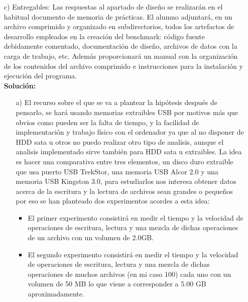 \documentclass[a4paper, 10pt]{article} %
\begin{document}
\begin{itemize}
\item[c)] Entregables:
Las respuestas al apartado de diseño se realizarán en el habitual documento de memoria de prácticas.
El alumno adjuntará, en un archivo comprimido y organizado en subdirectorios, todos los artefactos de desarrollo empleados en la creación del benchmark: código fuente debidamente comentado, documentación de diseño, archivos de datos con la carga de trabajo, etc. Además proporcionará un manual con la organización de los contenidos del archivo comprimido e instrucciones para la instalación y ejecución del programa.\\
\textbf{Solución:}
\begin{itemize}
\item[a)] El recurso sobre el que se va a plantear la hipótesis después de pensarlo, se hará usando memorias extraibles USB por motivos más que obvios como pueden ser la falta de tiempo, y la facilidad de implementación y trabajo físico con el ordenador ya que al no disponer de HDD sata u otros no puedo realizar otro tipo de analisis, aunque el analisis implementado sirve también para HDD sata u extraibles. La idea es hacer una comparativa entre tres elementos, un disco duro extraible que usa puerto USB TrekStor, una memoria USB Alcor 2.0 y una memoria USB Kingston 3.0, para estudiarlos nos interesa obtener datos acerca de la escritura y la lectura de archivos sean grandes o pequeños por eso se han planteado dos experimentos acordes a esta idea:
	\begin{itemize}
		\item El primer experimento consistirá en medir el tiempo y la velocidad de operaciones de escritura, lectura y una mezcla de dichas operaciones de un archivo con un volumen de 2.0GB.
		\item El segundo experimento consistirá en medir el tiempo y la velocidad de operaciones de escritura, lectura y una mezcla de dichas operaciones de muchos archivos (en mi caso 100) cada uno con un volumen de 50 MB lo que viene a corresponder a 5.00 GB aproximadamente.
	\end{itemize}


\end{itemize}
\end{itemize}
\end{document}
